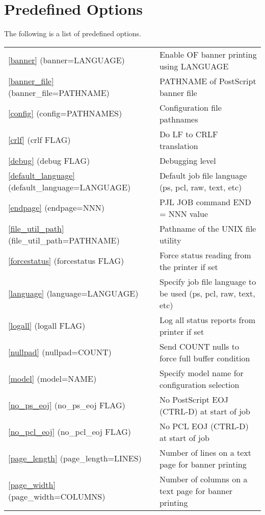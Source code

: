\documentclass[a4paper]{article}
\begin{document}
\section{Predefined Options}

The following is a list of predefined options.
\begin{table}[tbp]
\begin{center}
\begin{tabular}{ll}
{\ttfamily \ref{banner} {(banner=LANGUAGE)}}&  Enable OF banner printing using LANGUAGE\\ 
{\ttfamily \ref{banner_file} {(banner\_file=PATHNAME)}}&  PATHNAME of PostScript banner file\\ 
{\ttfamily \ref{config} {(config=PATHNAMES)}}&  Configuration file pathnames\\ 
{\ttfamily \ref{crlf} {(crlf FLAG)}}&  Do LF to CRLF translation\\ 
{\ttfamily \ref{debug} {(debug FLAG)}}&  Debugging level\\ 
{\ttfamily \ref{default_language} {(default\_language=LANGUAGE)}}&  Default job file language (ps, pcl, raw, text, etc)\\ 
{\ttfamily \ref{endpage} {(endpage=NNN)}}&  PJL JOB command END = NNN value\\ 
{\ttfamily \ref{file_util_path} {(file\_util\_path=PATHNAME)}}&  Pathname of the UNIX file utility\\ 
{\ttfamily \ref{forcestatus} {(forcestatus FLAG)}}&  Force status reading from the printer if set\\ 
{\ttfamily \ref{language} {(language=LANGUAGE)}}&  Specify job file language to be used (ps, pcl, raw, text, etc)\\ 
{\ttfamily \ref{logall} {(logall FLAG)}}&  Log all status reports from printer if set\\ 
{\ttfamily \ref{nullpad} {(nullpad=COUNT)}}&  Send COUNT nulls to force full buffer condition\\ 
{\ttfamily \ref{model} {(model=NAME)}}&  Specify model name for configuration selection\\ 
{\ttfamily \ref{no_ps_eoj} {(no\_ps\_eoj FLAG)}}&  No PostScript EOJ (CTRL-D) at start of job\\ 
{\ttfamily \ref{no_pcl_eoj} {(no\_pcl\_eoj FLAG)}}&  No PCL EOJ (CTRL-D) at start of job\\ 
{\ttfamily \ref{page_length} {(page\_length=LINES)}}&  Number of lines on a text page for banner printing\\ 
{\ttfamily \ref{page_width} {(page\_width=COLUMNS)}}&  Number of columns on a text page for banner printing\\ 

\end{tabular}
\end{center}
\end{table}
\end{document}
